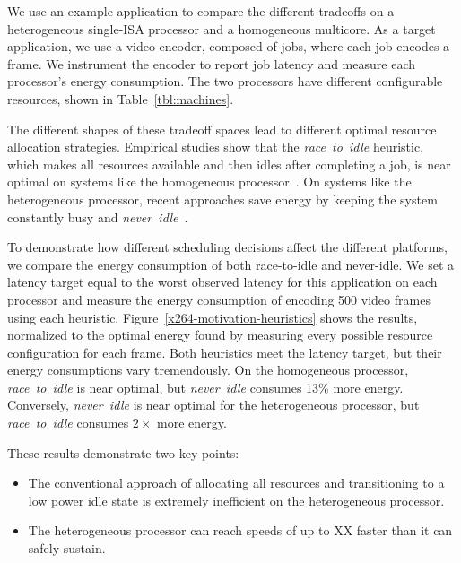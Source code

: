 We use an example application to compare the different tradeoffs on a
heterogeneous single-ISA processor and a homogeneous multicore.  As a
target application, we use a video encoder, composed of jobs, where
each job encodes a frame. We instrument the encoder to report job
latency and measure each processor's energy consumption.  The two
processors have different configurable resources, shown in
Table~\ref{tbl:machines}.

\begin{comment}
\begin{figure}[t]
\vskip -1.8em
\subfloat[Energy/Latency Tradeoffs]%
{%
\label{fig:x264-motivation-tradeoffs}}
\subfloat[Energy Consumption]%
{%
\label{fig:x264-motivation-heuristics}}
\caption{Energy/latency tradeoffs.}
\label{fig:x264-motivation}
\end{figure}
\end{comment}

The different shapes of these tradeoff spaces lead to different
optimal resource allocation strategies. Empirical studies show that
the \emph{race~to~idle} heuristic, which makes all resources available
and then idles after completing a job, is near optimal on systems like
the homogeneous
processor~\cite{PowerSlope,Hoelzle2009,google,Imes2014,HotPower}.  On
systems like the heterogeneous processor, recent approaches save
energy by keeping the system constantly busy and
\emph{never~idle}~\cite{Carroll13,LeSueur11,Lin2010,Imes2014,HotPower}.

To demonstrate how different scheduling decisions affect the different
platforms, we compare the energy consumption of both race-to-idle and
never-idle.  We set a latency target equal to the worst observed
latency for this application on each processor and measure the energy
consumption of encoding 500 video frames using each heuristic.
Figure~\ref{x264-motivation-heuristics} shows the results, normalized to
the optimal energy found by measuring every possible resource
configuration for each frame.  Both heuristics meet the latency
target, but their energy consumptions vary tremendously. On the
homogeneous processor, \emph{race~to~idle} is near optimal, but
\emph{never~idle} consumes 13\% more energy.  Conversely,
\emph{never~idle} is near optimal for the heterogeneous processor, but
\emph{race~to~idle} consumes $2 \times$ more energy.

These results demonstrate two key points:
\begin{itemize}
\item The conventional approach of allocating all resources and
transitioning to a low power idle state is extremely inefficient on
the heterogeneous processor.  
\item The heterogeneous processor can
reach speeds of up to XX faster than it can safely sustain.
\end{itemize}
